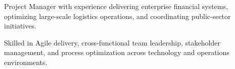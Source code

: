 

\begin{cvparagraph}

Project Manager with experience delivering enterprise financial systems, optimizing large-scale logistics operations, and coordinating public-sector initiatives.

Skilled in Agile delivery, cross-functional team leadership, stakeholder management, and process optimization across technology and operations environments.
\end{cvparagraph}




